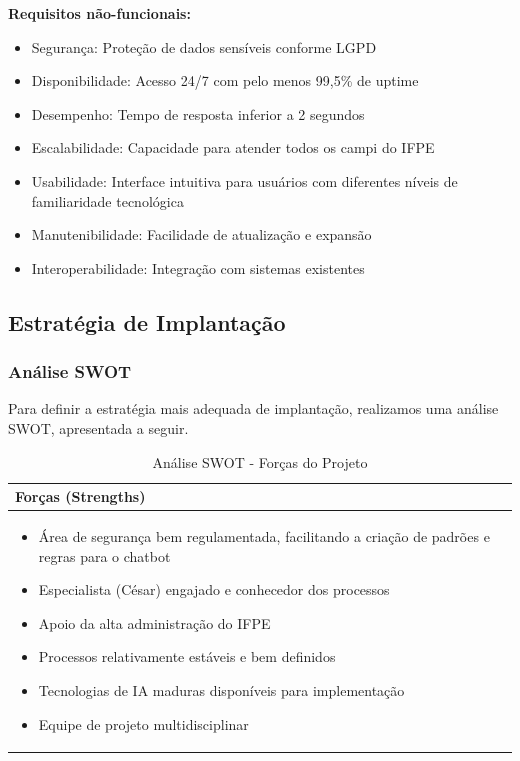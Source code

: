 \documentclass[12pt,a4paper]{article}
\begin{document}
\textbf{Requisitos não-funcionais:}

\begin{itemize}
    \item Segurança: Proteção de dados sensíveis conforme LGPD
    \item Disponibilidade: Acesso 24/7 com pelo menos 99,5\% de uptime
    \item Desempenho: Tempo de resposta inferior a 2 segundos
    \item Escalabilidade: Capacidade para atender todos os campi do IFPE
    \item Usabilidade: Interface intuitiva para usuários com diferentes níveis de familiaridade tecnológica
    \item Manutenibilidade: Facilidade de atualização e expansão
    \item Interoperabilidade: Integração com sistemas existentes
\end{itemize}

\subsection{Estratégia de Implantação}

\subsubsection{Análise SWOT}

Para definir a estratégia mais adequada de implantação, realizamos uma análise SWOT, apresentada a seguir.

\begin{table}[htbp]
\centering
\begin{tcolorbox}[enhanced, colback=green!5, colframe=green!40!black, arc=3mm, boxrule=0.5pt, width=0.85\textwidth]
\begin{tabular}{|p{12cm}|}
\hline
\rowcolor{green!10}\large \textbf{Forças (Strengths)} \\
\hline
\begin{itemize}\setlength{\itemsep}{1pt}
\item Área de segurança bem regulamentada, facilitando a criação de padrões e regras para o chatbot
\item Especialista (César) engajado e conhecedor dos processos
\item Apoio da alta administração do IFPE
\item Processos relativamente estáveis e bem definidos
\item Tecnologias de IA maduras disponíveis para implementação
\item Equipe de projeto multidisciplinar
\end{itemize} \\
\hline
\end{tabular}
\end{tcolorbox}
\caption{Análise SWOT - Forças do Projeto}
\end{table}
\end{document}
